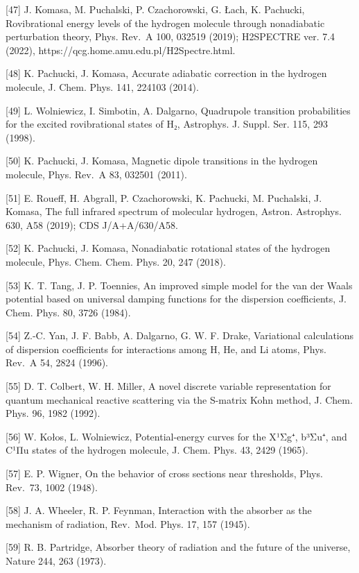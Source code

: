 \documentclass[
  a4paper,
]{ltjsarticle}
\begin{document}
{[}47{]} J. Komasa, M. Puchalski, P. Czachorowski, G. Łach, K. Pachucki,
Rovibrational energy levels of the hydrogen molecule through
nonadiabatic perturbation theory, Phys. Rev.~A 100, 032519 (2019);
H2SPECTRE ver. 7.4 (2022), https://qcg.home.amu.edu.pl/H2Spectre.html.

{[}48{]} K. Pachucki, J. Komasa, Accurate adiabatic correction in the
hydrogen molecule, J. Chem. Phys. 141, 224103 (2014).

{[}49{]} L. Wolniewicz, I. Simbotin, A. Dalgarno, Quadrupole transition
probabilities for the excited rovibrational states of H₂, Astrophys. J.
Suppl. Ser. 115, 293 (1998).

{[}50{]} K. Pachucki, J. Komasa, Magnetic dipole transitions in the
hydrogen molecule, Phys. Rev.~A 83, 032501 (2011).

{[}51{]} E. Roueff, H. Abgrall, P. Czachorowski, K. Pachucki, M.
Puchalski, J. Komasa, The full infrared spectrum of molecular hydrogen,
Astron. Astrophys. 630, A58 (2019); CDS J/A+A/630/A58.

{[}52{]} K. Pachucki, J. Komasa, Nonadiabatic rotational states of the
hydrogen molecule, Phys. Chem. Chem. Phys. 20, 247 (2018).

{[}53{]} K. T. Tang, J. P. Toennies, An improved simple model for the
van der Waals potential based on universal damping functions for the
dispersion coefficients, J. Chem. Phys. 80, 3726 (1984).

{[}54{]} Z.-C. Yan, J. F. Babb, A. Dalgarno, G. W. F. Drake, Variational
calculations of dispersion coefficients for interactions among H, He,
and Li atoms, Phys. Rev.~A 54, 2824 (1996).

{[}55{]} D. T. Colbert, W. H. Miller, A novel discrete variable
representation for quantum mechanical reactive scattering via the
S-matrix Kohn method, J. Chem. Phys. 96, 1982 (1992).

{[}56{]} W. Kołos, L. Wolniewicz, Potential-energy curves for the X¹Σg⁺,
b³Σu⁺, and C¹Πu states of the hydrogen molecule, J. Chem. Phys. 43, 2429
(1965).

{[}57{]} E. P. Wigner, On the behavior of cross sections near
thresholds, Phys. Rev.~73, 1002 (1948).

{[}58{]} J. A. Wheeler, R. P. Feynman, Interaction with the absorber as
the mechanism of radiation, Rev.~Mod. Phys. 17, 157 (1945).

{[}59{]} R. B. Partridge, Absorber theory of radiation and the future of
the universe, Nature 244, 263 (1973).
\end{document}
